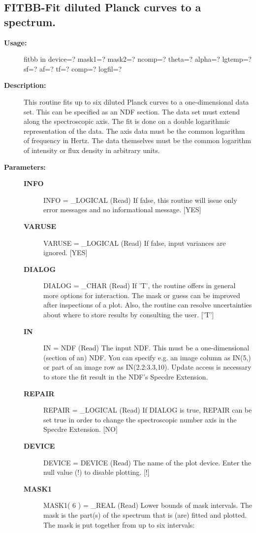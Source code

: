 \subsection{FITBB-\label{FITBB}Fit diluted Planck curves to a spectrum.}
\begin{description}

\item [{\bf Usage:}]

   fitbb in device=? mask1=? mask2=?
      ncomp=? theta=? alpha=? lgtemp=? sf=? af=? tf=?
      comp=? logfil=?


\item [{\bf Description:}]
   This routine fits up to six diluted Planck curves to a
   one-dimensional data set. This can be specified as an NDF section.
   The data set must extend along the spectroscopic axis. The fit is
   done on a double logarithmic representation of the data. The axis
   data must be the common logarithm of frequency in Hertz. The data
   themselves must be the common logarithm of intensity or flux
   density in arbitrary units.


\item [{\bf Parameters:}]
\begin{description}
\item [{\bf INFO}]
INFO = _LOGICAL (Read)
   If false, this routine will issue only error messages and no
   informational message. [YES]
\item [{\bf VARUSE}]
VARUSE = _LOGICAL (Read)
   If false, input variances are ignored. [YES]
\item [{\bf DIALOG}]
DIALOG = _CHAR (Read)
   If 'T', the routine offers in general more options for
   interaction. The mask or guess can be improved after
   inspections of a plot. Also, the routine can resolve
   uncertainties about where to store results by consulting the
   user. ['T']
\item [{\bf IN}]
IN = NDF (Read)
   The input NDF. This must be a one-dimensional (section of an)
   NDF. You can specify e.g. an image column as IN(5,) or part of
   an image row as IN(2.2:3.3,10). Update access is necessary to
   store the fit result in the NDF's Specdre Extension.
\item [{\bf REPAIR}]
REPAIR = _LOGICAL (Read)
   If DIALOG is true, REPAIR can be set true in order to change
   the spectroscopic number axis in the Specdre Extension. [NO]
\item [{\bf DEVICE}]
DEVICE = DEVICE (Read)
   The name of the plot device. Enter the null value (!) to
   disable plotting. [!]
\item [{\bf MASK1}]
MASK1( 6 ) = _REAL (Read)
   Lower bounds of mask intervals. The mask is the part(s) of the
   spectrum that is (are) fitted and plotted. The mask is put
   together from up to six intervals:


\end{description}
\end{description}
